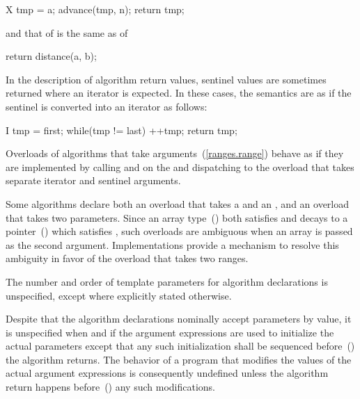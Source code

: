 \begin{codeblock}
X tmp = a;
advance(tmp, n);
return tmp;
\end{codeblock}

and that of
is the same as of

\begin{codeblock}
return distance(a, b);
\end{codeblock}

\begin{addedblock}
\pnum
In the description of algorithm return values, sentinel values are sometimes
returned where an iterator is expected. In these cases, the semantics are as
if the sentinel is converted into an iterator as follows:

\begin{codeblock}
I tmp = first;
while(tmp != last)
  ++tmp;
return tmp;
\end{codeblock}

\pnum
Overloads of algorithms that take  arguments~(\ref{ranges.range})
behave as if they are implemented by calling  and  on
the  and dispatching to the overload that takes separate
iterator and sentinel arguments.

\pnum
Some algorithms declare both an overload that takes a 
and an , and an overload that takes two 
parameters. Since an array type~() both satisfies
 and decays to a pointer~() which satisfies
, such overloads are ambiguous when an array is passed as
the second argument. Implementations provide a mechanism to resolve
this ambiguity in favor of the overload that takes two ranges.

\pnum
The number and order of template parameters for algorithm declarations
is unspecified, except where explicitly stated otherwise.

\pnum
Despite that the algorithm declarations nominally accept parameters
by value, it is unspecified when and if the argument expressions are used to
initialize the actual parameters except that any such initialization shall be
sequenced before~() the algorithm returns.
\enternote The behavior of a program that modifies the values of the actual
argument expressions is consequently undefined unless the algorithm return
happens before~() any such modifications. \exitnote

\end{addedblock}

